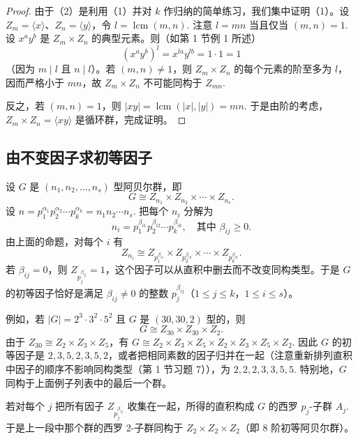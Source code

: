 \begin{proof}
由于（2）是利用（1）并对 \(k\) 作归纳的简单练习，我们集中证明（1）。设 \(Z_m = \langle x \rangle\)、\(Z_n = \langle y \rangle\)，令 \(l = \operatorname{lcm}(m, n)\). 注意 \(l = mn\) 当且仅当 \((m, n) = 1\). 设 \(x^a y^b\) 是 \(Z_m \times Z_n\) 的典型元素。则（如第 1 节例 1 所述）
\[
(x^a y^b)^l = x^{la} y^{lb} = 1 \cdot 1 = 1
\]
（因为 \(m \mid l\) 且 \(n \mid l\)）。若 \((m, n) \neq 1\)，则 \(Z_m \times Z_n\) 的每个元素的阶至多为 \(l\)，因而严格小于 \(mn\)，故 \(Z_m \times Z_n\) 不可能同构于 \(Z_{mn}\).

反之，若 \((m, n) = 1\)，则 \(|xy| = \operatorname{lcm}(|x|, |y|) = mn\). 于是由阶的考虑，\(Z_m \times Z_n = \langle xy \rangle\) 是循环群，完成证明。
\end{proof}

\subsection*{由不变因子求初等因子}

设 \(G\) 是 \((n_1, n_2, \ldots, n_s)\) 型阿贝尔群，即
\[
G \cong Z_{n_1} \times Z_{n_2} \times \cdots \times Z_{n_s}.
\]
设 \(n = p_1^{\alpha_1} p_2^{\alpha_2} \cdots p_k^{\alpha_k} = n_1n_2\cdots n_s\). 把每个 \(n_i\) 分解为
\[
n_i = p_1^{\beta_{i1}} p_2^{\beta_{i2}} \cdots p_k^{\beta_{ik}}, \quad \text{其中 } \beta_{ij} \geq 0.
\]
由上面的命题，对每个 \(i\) 有
\[
Z_{n_i} \cong Z_{p_1^{\beta_{i1}}} \times Z_{p_2^{\beta_{i2}}} \times \cdots \times Z_{p_k^{\beta_{ik}}}.
\]
若 \(\beta_{ij} = 0\)，则 \(Z_{p_j^{\beta_{ij}}} = 1\)，这个因子可以从直积中删去而不改变同构类型。于是 \(G\) 的初等因子恰好是满足 \(\beta_{ij} \neq 0\) 的整数 \(p_j^{\beta_{ij}}\)（\(1 \leq j \leq k\)，\(1 \leq i \leq s\)）。

例如，若 \(|G| = 2^3 \cdot 3^2 \cdot 5^2\) 且 \(G\) 是 \((30, 30, 2)\) 型的，则
\[
G \cong Z_{30} \times Z_{30} \times Z_2.
\]
由于 \(Z_{30} \cong Z_2 \times Z_3 \times Z_5\)，有 \(G \cong Z_2 \times Z_3 \times Z_5 \times Z_2 \times Z_3 \times Z_5 \times Z_2\). 因此 \(G\) 的初等因子是 \(2, 3, 5, 2, 3, 5, 2\)，或者把相同素数的因子归并在一起（注意重新排列直积中因子的顺序不影响同构类型（第 1 节习题 7）），为 \(2, 2, 2, 3, 3, 5, 5\). 特别地，\(G\) 同构于上面例子列表中的最后一个群。

若对每个 \(j\) 把所有因子 \(Z_{p_j^{\beta_{ij}}}\) 收集在一起，所得的直积构成 \(G\) 的西罗 \(p_j\)-子群 \(A_j\). 于是上一段中那个群的西罗 2-子群同构于 \(Z_2 \times Z_2 \times Z_2\)（即 8 阶初等阿贝尔群）。

